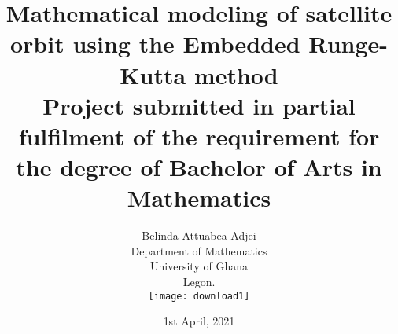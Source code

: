 \documentclass[12pt,a4paper]{article}
\begin{document}
\title{Mathematical modeling of satellite orbit using the Embedded Runge-Kutta method \\{\normalsize Project submitted in partial fulfilment of the requirement for the degree of Bachelor of Arts in Mathematics}}

\author{Belinda Attuabea Adjei \\ \vspace{7pt} {\normalsize Department of Mathematics} \\ University of Ghana \\ Legon. \\ {\texttt{[image: download1]}}}
\date{1st April, 2021}
\maketitle

\newpage

\tableofcontents{}

\newpage
\end{document}
